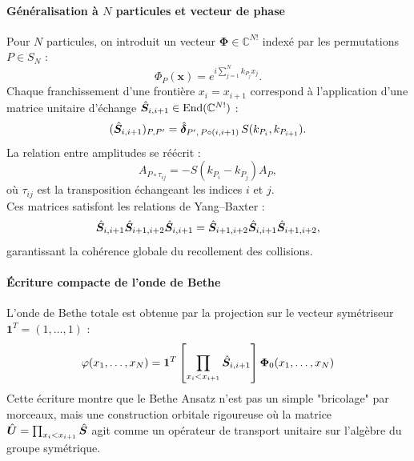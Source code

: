 \paragraph{Généralisation à $N$ particules et vecteur de phase}

Pour $N$ particules, on introduit un vecteur $\mathbf{\Phi} \in \mathbb{C}^{N!}$ indexé par les permutations $P \in S_N$ :
\begin{equation}
\Phi_{P}(\mathbf{x}) = e^{i \sum_{j=1}^N k_{P_j} x_j}.
\end{equation}
Chaque franchissement d'une frontière $x_i = x_{i+1}$ correspond à l'application d'une matrice unitaire d'échange $\hat{\bm{S}}_{i,i+1} \in \text{End}(\mathbb{C}^{N!})$ :
\begin{equation}
(\hat{\bm{S}}_{i,i+1})_{P,P'} = \hat{\bm{\delta}}_{P',\,P\circ(i,i+1)}\, S(k_{P_i},k_{P_{i+1}}).
\end{equation}
La relation entre amplitudes se réécrit :
\begin{equation}
A_{P\circ \tau_{ij}} = - S(k_{P_i} - k_{P_j}) A_{P},
\end{equation}
où $\tau_{ij}$ est la transposition échangeant les indices $i$ et $j$.\\

Ces matrices satisfont les relations de Yang--Baxter :
\begin{equation}
\hat{\bm{S}}_{i,i+1}\hat{\bm{S}}_{i+1,i+2}\hat{\bm{S}}_{i,i+1} = \hat{\bm{S}}_{i+1,i+2}\hat{\bm{S}}_{i,i+1}\hat{\bm{S}}_{i+1,i+2},
\end{equation}
garantissant la cohérence globale du recollement des collisions.

\paragraph{Écriture compacte de l'onde de Bethe}

L'onde de Bethe totale est obtenue par la projection sur le vecteur symétriseur $\mathbf{1}^T = (1, \dots, 1)$ :
\begin{equation}
\varphi(x_1,\ldots,x_N) = \mathbf{1}^T \left[ \prod_{x_i<x_{i+1}} \hat{\bm{S}}_{i,i+1} \right] \mathbf{\Phi}_0(x_1,\ldots,x_N)
\end{equation}
Cette écriture montre que le Bethe Ansatz n'est pas un simple "bricolage" par morceaux, mais une construction orbitale rigoureuse où la matrice $\hat{\bm{U}} = \prod_{x_i<x_{i+1}} \hat{\bm{S}}$ agit comme un opérateur de transport unitaire sur l'algèbre du groupe symétrique.


